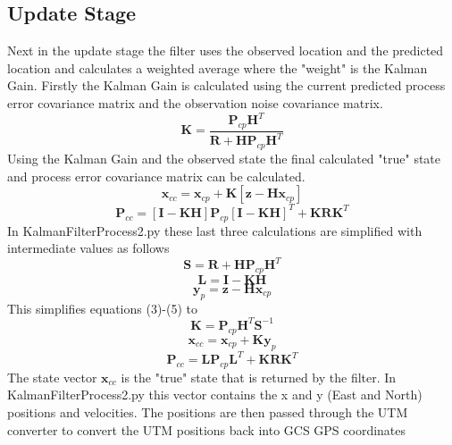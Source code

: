 \documentclass{article}
\begin{document}
\subsection{Update Stage}
Next in the update stage the filter uses the observed location and the predicted location and calculates a weighted average where the "weight" is the Kalman Gain. Firstly the Kalman Gain is calculated using the current predicted process error covariance matrix and the observation noise covariance matrix.
\begin{equation}
\textbf{K} = \frac{\textbf{P}_{cp}\textbf{H}^T}{\textbf{R}+\textbf{H}\textbf{P}_{cp}\textbf{H}^T}
\end{equation}
Using the Kalman Gain and the observed state the final calculated "true" state and process error covariance matrix can be calculated.
\begin{equation}
\textbf{x}_{cc} =\textbf{x}_{cp} + \textbf{K}[\textbf{z}-\textbf{H}\textbf{x}_{cp}]
\end{equation}
\begin{equation}
\textbf{P}_{cc}=[\textbf{I}-\textbf{K}\textbf{H}]\textbf{P}_{cp}[\textbf{I}-\textbf{K}\textbf{H}]^T+\textbf{K}\textbf{R}\textbf{K}^T
\end{equation}
In KalmanFilterProcess2.py these last three calculations are simplified with intermediate values as follows
\begin{equation}
\textbf{S} = \textbf{R}+\textbf{H}\textbf{P}_{cp}\textbf{H}^T
\end{equation} 
\begin{equation}
\textbf{L} = \textbf{I}-\textbf{K}\textbf{H}
\end{equation} 
\begin{equation}
\textbf{y}_p = \textbf{z}-\textbf{H}\textbf{x}_{cp}
\end{equation}
This simplifies equations (3)-(5) to 
\begin{equation}
\textbf{K} = \textbf{P}_{cp}\textbf{H}^T\textbf{S}^{-1}
\end{equation}
\begin{equation}
\textbf{x}_{cc} =\textbf{x}_{cp} + \textbf{K}\textbf{y}_p
\end{equation}
\begin{equation}
\textbf{P}_{cc}=\textbf{L}\textbf{P}_{cp}\textbf{L}^T+\textbf{K}\textbf{R}\textbf{K}^T
\end{equation}
The state vector $\textbf{x}_{cc}$ is the "true" state that is returned by the filter. In KalmanFilterProcess2.py this vector contains the x and y (East and North) positions and velocities. The positions are then passed through the UTM converter to convert the UTM positions back into GCS GPS coordinates 
\end{document}
